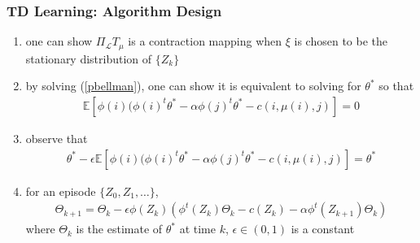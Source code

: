 \documentclass[t,10pt]{beamer}
\newcommand{\E}{\mathbb{E}}
\theoremstyle{remark}
\begin{document}
\begin{frame}

\frametitle{TD Learning: Algorithm Design}
\begin{enumerate}
\item one can show $\Pi_{\mathcal{L}} T_\mu$ is a contraction mapping when $\xi$ is chosen to be the stationary distribution of $\{Z_k\}$
\item by solving (\ref{pbellman}), one can show it is equivalent to solving for $\theta^*$ so that
\begin{align}
\E[ \phi(i)(\phi(i)^t \theta^* - \alpha \phi(j)^t \theta^*- c(i,\mu(i),j)] = 0
\end{align}
\item observe that
\begin{align}
\theta^*- \epsilon\E[ \phi(i)(\phi(i)^t \theta^* - \alpha \phi(j)^t \theta^*- c(i,\mu(i),j)] = \theta^*
\end{align}
\item for an episode $\{Z_0, Z_1, \ldots\}$,
\begin{align} \label{td0}
\Theta_{k+1} = \Theta_k - \epsilon \phi(Z_k) \left(\phi^t(Z_k)\Theta_k-c(Z_k)-\alpha \phi^t(Z_{k+1}) \Theta_k \right)
\end{align}
where $\Theta_k$ is the estimate of $\theta^*$ at time $k$, $\epsilon \in (0,1)$ is a constant
\end{enumerate}
\end{frame}















\end{document}
